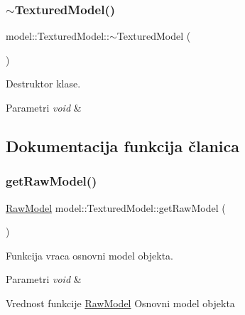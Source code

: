 \subsubsection{\texorpdfstring{$\sim$\+Textured\+Model()}{~TexturedModel()}}
{\footnotesize\ttfamily model\+::\+Textured\+Model\+::$\sim$\+Textured\+Model (\begin{DoxyParamCaption}{ }\end{DoxyParamCaption})}



Destruktor klase. 


\begin{DoxyParams}{Parametri}
{\em void} & \\
\hline
\end{DoxyParams}


\subsection{Dokumentacija funkcija članica}
\mbox{\label{classmodel_1_1TexturedModel_a8074adea6d7e368690a977b4ad571378}} 
\subsubsection{\texorpdfstring{get\+Raw\+Model()}{getRawModel()}}
{\footnotesize\ttfamily \hyperlink{classmodel_1_1RawModel}{Raw\+Model} model\+::\+Textured\+Model\+::get\+Raw\+Model (\begin{DoxyParamCaption}\item[{void}]{ }\end{DoxyParamCaption})}



Funkcija vraca osnovni model objekta. 


\begin{DoxyParams}{Parametri}
{\em void} & \\
\hline
\end{DoxyParams}
\begin{DoxyReturn}{Vrednost funkcije}
\hyperlink{classmodel_1_1RawModel}{Raw\+Model} Osnovni model objekta 
\end{DoxyReturn}
\mbox{\label{classmodel_1_1TexturedModel_ad2bb5d174a506bd9d1f807e84aba4cdc}} 
